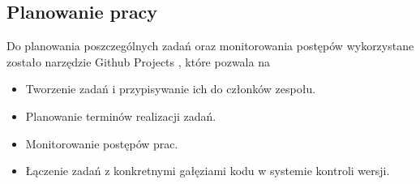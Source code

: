 \subsection{Planowanie pracy}
Do planowania poszczególnych zadań oraz monitorowania postępów wykorzystane zostało narzędzie Github Projects \cite{github-projects-docs}, które pozwala na
\begin{itemize}
    \item Tworzenie zadań i przypisywanie ich do członków zespołu.
    \item Planowanie terminów realizacji zadań.
    \item Monitorowanie postępów prac.
    \item Łączenie zadań z konkretnymi gałęziami kodu w systemie kontroli wersji.
\end{itemize}
